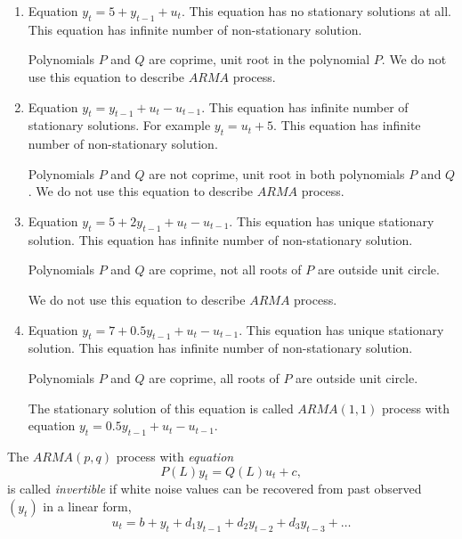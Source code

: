 \documentclass[12pt]{article} %
\begin{document}
\begin{enumerate}
    \item Equation $y_t = 5 + y_{t-1} + u_t$.
    This equation has no stationary solutions at all. 
    This equation has infinite number of non-stationary solution. 

    Polynomials $P$ and $Q$ are coprime, unit root in the polynomial $P$. 
    We do not use this equation to describe $ARMA$ process. 

    \item Equation $y_t = y_{t-1} + u_t - u_{t-1}$.
    This equation has infinite number of stationary solutions. For example $y_t = u_t + 5$.
    This equation has infinite number of non-stationary solution. 
    
    Polynomials $P$ and $Q$ are not coprime, unit root in both polynomials $P$ and $Q$.
    We do not use this equation to describe $ARMA$ process. 

    \item Equation $y_t = 5 + 2 y_{t-1} + u_t - u_{t-1}$.
    This equation has unique stationary solution. 
    This equation has infinite number of non-stationary solution. 
    
    Polynomials $P$ and $Q$ are coprime, not all roots of $P$ are outside unit circle. 

    We do not use this equation to describe $ARMA$ process. 

    \item Equation $y_t = 7 + 0.5 y_{t-1} + u_t - u_{t-1}$.
    This equation has unique stationary solution. 
    This equation has infinite number of non-stationary solution. 
    
    Polynomials $P$ and $Q$ are coprime, all roots of $P$ are outside unit circle. 

    The stationary solution of this equation is called $ARMA(1, 1)$ process with equation $y_t = 0.5 y_{t-1} + u_t - u_{t-1}$.


\end{enumerate}



\begin{definition}
    The $ARMA(p, q)$ process with \textit{equation}
    \[
    P(L) y_t = Q(L) u_t + c,    
    \]
    is called \textit{invertible} if white noise values can be recovered from past observed $(y_t)$ in a linear form,
    \[
       u_t = b + y_t + d_1 y_{t-1} + d_2 y_{t-2} + d_3 y_{t-3} + \ldots      
    \]
\end{definition}
\end{document}
